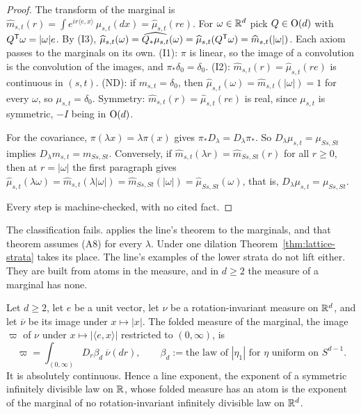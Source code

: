 \begin{proof}
The transform of the marginal is $\widehat m_{s,t}(r) = \int e^{ir\langle e, x\rangle}\,\mu_{s,t}(dx)
= \widehat\mu_{s,t}(re)$. For $\omega \in \mathbb{R}^d$ pick $Q \in \mathrm{O}(d)$ with $Q^{\mathsf{T}}\omega = |\omega|e$.
By (I3), $\widehat\mu_{s,t}(\omega) = \widehat{Q_*\mu_{s,t}}(\omega) = \widehat\mu_{s,t}(Q^{\mathsf{T}}\omega)
= \widehat m_{s,t}(|\omega|)$. Each axiom passes to the marginals on its own. (I1): $\pi$ is linear,
so the image of a convolution is the convolution of the images, and $\pi_*\delta_0 = \delta_0$.
(I2): $\widehat m_{s,t}(r) = \widehat\mu_{s,t}(re)$ is continuous in $(s,t)$. (ND): if
$m_{s,t} = \delta_0$, then $\widehat\mu_{s,t}(\omega) = \widehat m_{s,t}(|\omega|) = 1$ for every
$\omega$, so $\mu_{s,t} = \delta_0$. Symmetry: $\widehat m_{s,t}(r) = \widehat\mu_{s,t}(re)$ is real,
since $\mu_{s,t}$ is symmetric, $-I$ being in $\mathrm{O}(d)$.

For the covariance, $\pi(\lambda x) = \lambda\pi(x)$ gives $\pi_*D_\lambda = D_\lambda\pi_*$. So
$D_\lambda\mu_{s,t} = \mu_{Ss,St}$ implies $D_\lambda m_{s,t} = m_{Ss,St}$. Conversely, if
$\widehat m_{s,t}(\lambda r) = \widehat m_{Ss,St}(r)$ for all $r \ge 0$, then at $r = |\omega|$ the
first paragraph gives $\widehat\mu_{s,t}(\lambda\omega) = \widehat m_{s,t}(\lambda|\omega|) =
\widehat m_{Ss,St}(|\omega|) = \widehat\mu_{Ss,St}(\omega)$, that is,
$D_\lambda\mu_{s,t} = \mu_{Ss,St}$.

Every step is machine-checked, with no cited fact.
\end{proof}

The classification fails.  applies the line's theorem to
the marginals, and that theorem assumes (A8) for every $\lambda$. Under one dilation
Theorem~\ref{thm:lattice-strata} takes its place. The line's examples of the lower strata do not lift
either. They are built from atoms in the \Levy{} measure, and in $d \ge 2$ the \Levy{} measure of a
marginal has none.

\begin{proposition}
\label{prop:what-does-not-lift}

Let $d \ge 2$, let $e$ be a unit vector, let $\nu$ be a rotation-invariant \Levy{} measure on
$\mathbb{R}^d$, and let $\overline\nu$ be its image under $x \mapsto |x|$. The folded \Levy{} measure of the
marginal, the image $\varpi$ of $\nu$ under $x \mapsto |\langle e, x\rangle|$ restricted to
$(0,\infty)$, is
\[
  \varpi = \int_{(0,\infty)}D_r\beta_d\ \overline\nu(dr), \qquad
  \beta_d := \text{the law of } |\eta_1| \text{ for } \eta \text{ uniform on } S^{d-1}.
\]
It is absolutely continuous. Hence a line exponent, the exponent of a symmetric infinitely divisible
law on $\mathbb{R}$, whose folded \Levy{} measure has an atom is the exponent of the marginal of no rotation-invariant
infinitely divisible law on $\mathbb{R}^d$.
\end{proposition}

